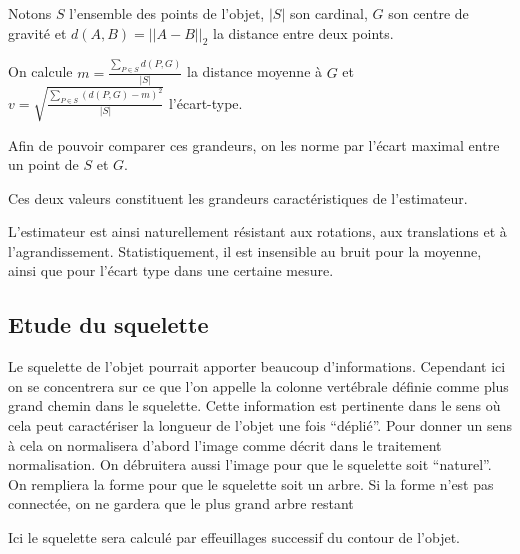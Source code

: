 \documentclass{article}
\theoremstyle{definition}
\begin{document}
      Notons $S$ l'ensemble des points de l'objet, $|S|$ son cardinal, $G$ son centre de gravité et $d(A,B)=||A-B||_2$ la distance entre deux points.
      
      On calcule $m=\frac{\sum_{P\in S}d(P,G)}{|S|}$ la distance moyenne à $G$ et $v=\sqrt{\frac{\sum_{P\in S}\left ( d(P,G) -m\right ) ^2}{|S|}}$ l'écart-type.
      
      Afin de pouvoir comparer ces grandeurs, on les norme par l'écart maximal entre un point de $S$ et $G$.
      
      Ces deux valeurs constituent les grandeurs caractéristiques de l'estimateur.
      
      L'estimateur est ainsi naturellement résistant aux rotations, aux translations et à l'agrandissement. Statistiquement, il est insensible au bruit pour la moyenne, ainsi que pour l'écart type dans une certaine mesure.
    
    \subsection{Etude du squelette} 
    
    Le squelette de l'objet pourrait apporter beaucoup d'informations. Cependant ici on se concentrera sur ce que l'on appelle la colonne vertébrale définie comme plus grand chemin dans le squelette. Cette information est pertinente dans le sens où cela peut caractériser la longueur de l'objet une fois ``déplié''. Pour donner un sens à cela on normalisera d'abord l'image comme décrit dans le traitement normalisation. On débruitera aussi l'image pour que le squelette soit ``naturel''. On rempliera la forme pour que le squelette soit un arbre. Si la forme n'est pas connectée, on ne gardera que le plus grand arbre restant
    
    Ici le squelette sera calculé par effeuillages successif du contour de l'objet.
    
\end{document}
